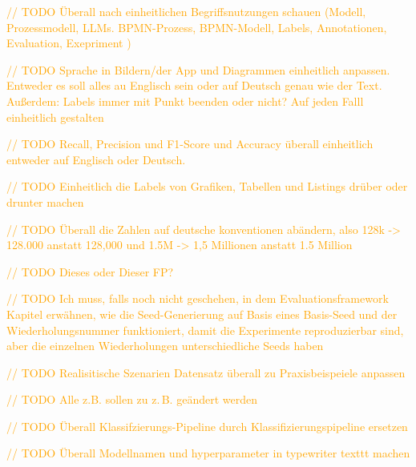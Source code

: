 \textcolor{orange}{// TODO Überall nach einheitlichen Begriffsnutzungen schauen (Modell, Prozessmodell, LLMs. BPMN-Prozess, BPMN-Modell, Labels, Annotationen, Evaluation, Exepriment )}

\textcolor{orange}{// TODO Sprache in Bildern/der App und Diagrammen einheitlich anpassen. Entweder es soll alles au Englisch sein oder auf Deutsch genau wie der Text. Außerdem: Labels immer mit Punkt beenden oder nicht? Auf jeden Falll einheitlich gestalten}

\textcolor{orange}{// TODO Recall, Precision und F1-Score und Accuracy überall einheitlich entweder auf Englisch oder Deutsch.}

\textcolor{orange}{// TODO Einheitlich die Labels von Grafiken, Tabellen und Listings drüber oder drunter machen}

\textcolor{orange}{// TODO Überall die Zahlen auf deutsche konventionen abändern, also 128k -> 128.000 anstatt 128,000 und 1.5M -> 1,5 Millionen anstatt 1.5 Million}

\textcolor{orange}{// TODO Dieses oder Dieser FP?}

\textcolor{orange}{// TODO Ich muss, falls noch nicht geschehen, in dem Evaluationsframework Kapitel erwähnen, wie die Seed-Generierung auf Basis eines Basis-Seed und der Wiederholungsnummer funktioniert, damit die Experimente reproduzierbar sind, aber die einzelnen Wiederholungen unterschiedliche Seeds haben}

\textcolor{orange}{// TODO Realisitische Szenarien Datensatz überall zu Praxisbeispeiele anpassen}

\textcolor{orange}{// TODO Alle z.B. sollen zu z.\,B. geändert werden}

\textcolor{orange}{// TODO Überall Klassifzierungs-Pipeline durch Klassifizierungspipeline ersetzen}

\textcolor{orange}{// TODO Überall Modellnamen und hyperparameter in typewriter texttt machen}












